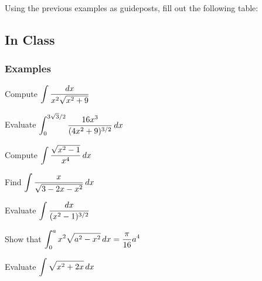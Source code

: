 \documentclass[notes]{subfiles}
\begin{document}
		\begin{question}
			Using the previous examples as guideposts, fill out the following table:
			\begin{center}
		\end{center}
		\end{question}
			\newpage
			
	\subsection*{In Class}
	\subsubsection*{Examples}
		\begin{ex}
			Compute $\displaystyle \int \dfrac{dx}{x^2\sqrt{x^2 + 9}}$
		\end{ex}
			
		\begin{ex}
			Evaluate $\displaystyle \int_0^{3\sqrt{3}/2} \dfrac{16x^3}{(4x^2+9)^{3/2}}\, dx$
		\end{ex}
			\newpage
			
		\begin{ex}
			Compute $\displaystyle \int \dfrac{\sqrt{x^2-1}}{x^4}\, dx$
		\end{ex}
			
		\begin{ex}
			Find $\displaystyle \int \dfrac{x}{\sqrt{3-2x-x^2}}\, dx$
		\end{ex}
			\newpage
			
		\begin{ex}
			Evaluate $\displaystyle \int \dfrac{dx}{(x^2-1)^{3/2}}$
		\end{ex}
			
		\begin{ex}
			Show that $\displaystyle \int_0^a x^2\sqrt{a^2-x^2}\, dx = \dfrac{\pi}{16}a^4$
		\end{ex}
			\newpage
			
		\begin{ex}
			Evaluate $\displaystyle \int \sqrt{x^2 + 2x}\, dx$
		\end{ex}
			
\end{document}

